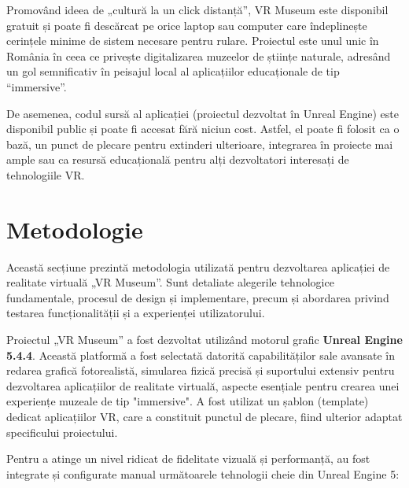 Promovând ideea de „cultură la un click distanță”, VR Museum este disponibil gratuit și poate fi descărcat pe orice laptop sau computer care îndeplinește cerințele minime de sistem necesare pentru rulare. Proiectul este unul unic în România în ceea ce privește digitalizarea muzeelor de științe naturale, adresând un gol semnificativ în peisajul local al aplicațiilor educaționale de tip “immersive”.

De asemenea, codul sursă al aplicației (proiectul dezvoltat în Unreal Engine) este disponibil public și poate fi accesat fără niciun cost. Astfel, el poate fi folosit ca o bază, un punct de plecare pentru extinderi ulterioare, integrarea în proiecte mai ample sau ca resursă educațională pentru alți dezvoltatori interesați de tehnologiile VR.

\section{Metodologie}

Această secțiune prezintă metodologia utilizată pentru dezvoltarea aplicației de realitate virtuală „VR Museum”. Sunt detaliate alegerile tehnologice fundamentale, procesul de design și implementare, precum și abordarea privind testarea funcționalității și a experienței utilizatorului. 

Proiectul „VR Museum” a fost dezvoltat utilizând motorul grafic \textbf{Unreal Engine 5.4.4}. Această platformă a fost selectată datorită capabilităților sale avansate în redarea grafică fotorealistă, simularea fizică precisă și suportului extensiv pentru dezvoltarea aplicațiilor de realitate virtuală, aspecte esențiale pentru crearea unei experiențe muzeale de tip "immersive". A fost utilizat un șablon (template) dedicat aplicațiilor VR, care a constituit punctul de plecare, fiind ulterior adaptat specificului proiectului. 

Pentru a atinge un nivel ridicat de fidelitate vizuală și performanță, au fost integrate și configurate manual următoarele tehnologii cheie din Unreal Engine 5: 

